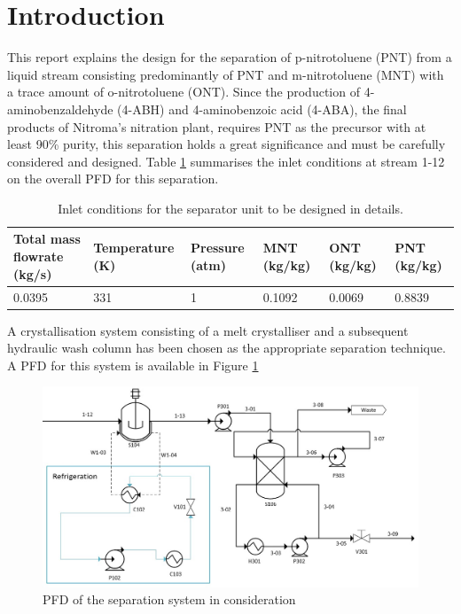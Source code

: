\section{Introduction}

This report explains the design for the separation of p-nitrotoluene (PNT) from a liquid stream consisting predominantly of PNT and m-nitrotoluene (MNT) with a trace amount of o-nitrotoluene (ONT). Since the production of 4-aminobenzaldehyde (4-ABH) and 4-aminobenzoic acid (4-ABA), the final products of Nitroma's nitration plant, requires PNT as the precursor with at least 90\% purity, this separation holds a great significance and must be carefully considered and designed. Table \ref{tab:inlet crystalliser} summarises the inlet conditions at stream 1-12 on the overall PFD for this separation. 

\begin{table}[h] \label{tab:inlet crystalliser}
\centering
\caption{Inlet conditions for the separator unit to be designed in details.}
\begin{tabular}{@{}l|l|l|l|l|l@{}}
\toprule
\textbf{Total mass flowrate (kg/s)}  & \textbf{Temperature (K)}  & \textbf{Pressure (atm)} & \textbf{MNT (kg/kg)} & \textbf{ONT (kg/kg)} & \textbf{PNT (kg/kg)}   \\ \midrule
0.0395  & 331 &  1 & 0.1092 & 0.0069  &   0.8839 \\ \bottomrule
\end{tabular}
\end{table}

A crystallisation system consisting of a melt crystalliser and a subsequent hydraulic wash column has been chosen as the appropriate separation technique. A PFD for this system is available in Figure \ref{fig:separator PFD}


\begin{figure}[h]
    \centering
    \includegraphics[scale=0.5]{chapters/3-separation/figures/Crystallizer PFD.jpg}
    \caption{PFD of the separation system in consideration}
    \label{fig:separator PFD}
\end{figure}

